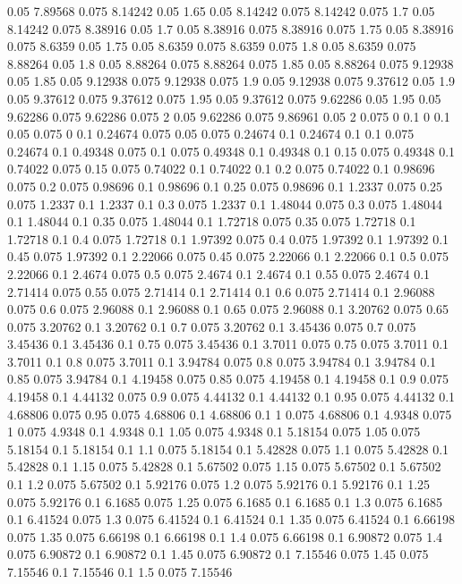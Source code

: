 0.05 7.89568
0.075 8.14242
0.05 1.65
0.05 8.14242
0.075 8.14242
0.075 1.7
0.05 8.14242
0.075 8.38916
0.05 1.7
0.05 8.38916
0.075 8.38916
0.075 1.75
0.05 8.38916
0.075 8.6359
0.05 1.75
0.05 8.6359
0.075 8.6359
0.075 1.8
0.05 8.6359
0.075 8.88264
0.05 1.8
0.05 8.88264
0.075 8.88264
0.075 1.85
0.05 8.88264
0.075 9.12938
0.05 1.85
0.05 9.12938
0.075 9.12938
0.075 1.9
0.05 9.12938
0.075 9.37612
0.05 1.9
0.05 9.37612
0.075 9.37612
0.075 1.95
0.05 9.37612
0.075 9.62286
0.05 1.95
0.05 9.62286
0.075 9.62286
0.075 2
0.05 9.62286
0.075 9.86961
0.05 2
0.075 0
0.1 0
0.1 0.05
0.075 0
0.1 0.24674
0.075 0.05
0.075 0.24674
0.1 0.24674
0.1 0.1
0.075 0.24674
0.1 0.49348
0.075 0.1
0.075 0.49348
0.1 0.49348
0.1 0.15
0.075 0.49348
0.1 0.74022
0.075 0.15
0.075 0.74022
0.1 0.74022
0.1 0.2
0.075 0.74022
0.1 0.98696
0.075 0.2
0.075 0.98696
0.1 0.98696
0.1 0.25
0.075 0.98696
0.1 1.2337
0.075 0.25
0.075 1.2337
0.1 1.2337
0.1 0.3
0.075 1.2337
0.1 1.48044
0.075 0.3
0.075 1.48044
0.1 1.48044
0.1 0.35
0.075 1.48044
0.1 1.72718
0.075 0.35
0.075 1.72718
0.1 1.72718
0.1 0.4
0.075 1.72718
0.1 1.97392
0.075 0.4
0.075 1.97392
0.1 1.97392
0.1 0.45
0.075 1.97392
0.1 2.22066
0.075 0.45
0.075 2.22066
0.1 2.22066
0.1 0.5
0.075 2.22066
0.1 2.4674
0.075 0.5
0.075 2.4674
0.1 2.4674
0.1 0.55
0.075 2.4674
0.1 2.71414
0.075 0.55
0.075 2.71414
0.1 2.71414
0.1 0.6
0.075 2.71414
0.1 2.96088
0.075 0.6
0.075 2.96088
0.1 2.96088
0.1 0.65
0.075 2.96088
0.1 3.20762
0.075 0.65
0.075 3.20762
0.1 3.20762
0.1 0.7
0.075 3.20762
0.1 3.45436
0.075 0.7
0.075 3.45436
0.1 3.45436
0.1 0.75
0.075 3.45436
0.1 3.7011
0.075 0.75
0.075 3.7011
0.1 3.7011
0.1 0.8
0.075 3.7011
0.1 3.94784
0.075 0.8
0.075 3.94784
0.1 3.94784
0.1 0.85
0.075 3.94784
0.1 4.19458
0.075 0.85
0.075 4.19458
0.1 4.19458
0.1 0.9
0.075 4.19458
0.1 4.44132
0.075 0.9
0.075 4.44132
0.1 4.44132
0.1 0.95
0.075 4.44132
0.1 4.68806
0.075 0.95
0.075 4.68806
0.1 4.68806
0.1 1
0.075 4.68806
0.1 4.9348
0.075 1
0.075 4.9348
0.1 4.9348
0.1 1.05
0.075 4.9348
0.1 5.18154
0.075 1.05
0.075 5.18154
0.1 5.18154
0.1 1.1
0.075 5.18154
0.1 5.42828
0.075 1.1
0.075 5.42828
0.1 5.42828
0.1 1.15
0.075 5.42828
0.1 5.67502
0.075 1.15
0.075 5.67502
0.1 5.67502
0.1 1.2
0.075 5.67502
0.1 5.92176
0.075 1.2
0.075 5.92176
0.1 5.92176
0.1 1.25
0.075 5.92176
0.1 6.1685
0.075 1.25
0.075 6.1685
0.1 6.1685
0.1 1.3
0.075 6.1685
0.1 6.41524
0.075 1.3
0.075 6.41524
0.1 6.41524
0.1 1.35
0.075 6.41524
0.1 6.66198
0.075 1.35
0.075 6.66198
0.1 6.66198
0.1 1.4
0.075 6.66198
0.1 6.90872
0.075 1.4
0.075 6.90872
0.1 6.90872
0.1 1.45
0.075 6.90872
0.1 7.15546
0.075 1.45
0.075 7.15546
0.1 7.15546
0.1 1.5
0.075 7.15546
